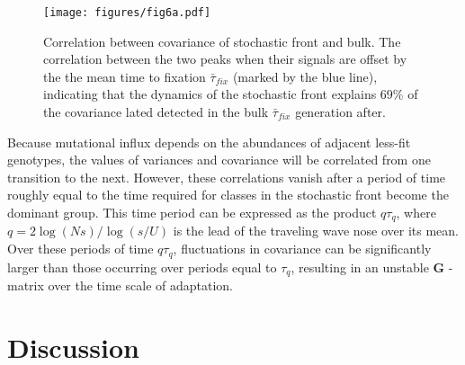 \documentclass[9pt,twocolumn,twoside]{gsajnl}
\newcommand{\G}{\textbf{G }}
\begin{document}
\begin{figure}[!ht]
\texttt{[image: figures/fig6a.pdf]}
\caption{Correlation between covariance of stochastic front and bulk.  The correlation between the two peaks when their signals are offset by the the mean time to fixation $\bar{\tau}_{fix}$ (marked by the blue line), indicating that the dynamics of the stochastic front explains 69\% of the covariance lated detected in the bulk $\bar{\tau}_{fix}$ generation after.}\label{fig:6}
% 
% 
\end{figure}

Because mutational influx depends on the abundances of adjacent less-fit genotypes, the values of variances and covariance will be correlated from one transition to the next. However, these correlations vanish after a period of time roughly equal to the time required for classes in the stochastic front become the dominant group. This time period can be expressed as the product $q \tau_q$, where $q = 2\log(Ns)/\log(s/U)$ is the lead of the traveling wave nose over its mean. Over these periods of time $q \tau_q$, fluctuations in covariance can be significantly larger than those occurring over periods equal to $\tau_q$, resulting in an unstable \G-matrix over the time scale of adaptation. \par
% 
% 

\section*{Discussion}
\label{sec:discussion}
\end{document}
